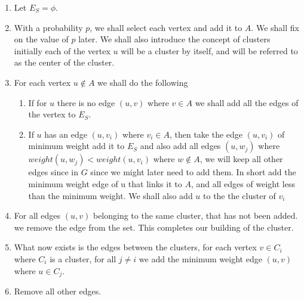 \documentclass{assignment}
\begin{document}
\begin{problemlist}
\begin{problem}
\begin{answer}
\begin{enumerate}
 \item Let $E_S=\phi$. 
 \item With a probability $p$, we shall select each vertex and add it to $A$. We shall fix on the value of $p$ later. We shall also introduce the concept of clusters initially each of the vertex $u$ will be a cluster by itself, and will be referred to as the center of the cluster. 
 \item For each vertex $u \notin A$ we shall do the following
 \begin{enumerate}
  \item If for $u$ there is no edge $(u,v)$ where $v \in A$ we shall add all the edges of the vertex to $E_S$.
  \item If $u$ has an edge $(u,v_i)$ where $v_i \in A$, then take the edge $(u,v_i)$ of minimum weight add it to $E_S$ and also add all edges $(u,w_j)$ where $weight(u,w_j) < weight(u,v_i)$ where $w \notin A$, we will keep all other edges since in $G$ since we might later need to add them. In short add the minimum weight edge of u that links it to $A$, and all edges of weight less than the  minimum weight. We shall also add $u$ to the the cluster of $v_i$
 \end{enumerate}
 \item For all edges $(u,v)$ belonging to the same cluster, that has not been added. we remove the edge from the set. This completes our building of the cluster. 
 \item What now exists is the edges between the clusters, for each vertex $v \in C_i$ where $C_i$ is a cluster, for all $j \neq i$ we add the minimum weight edge $(u,v)$ where $u \in C_j$.
 \item Remove all other edges.   
\end{enumerate}


\end{answer}
\end{problem}
\end{problemlist}
\end{document}
